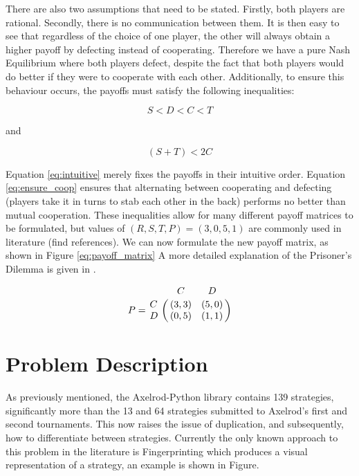 There are also two assumptions that need to be stated.
Firstly, both players are rational.
Secondly, there is no communication between them.
It is then easy to see that regardless of the choice of one player, the other will always obtain a higher payoff by defecting instead of cooperating.
Therefore we have a pure Nash Equilibrium where both players defect, despite the fact that both players would do better if they were to cooperate with each other.
Additionally, to ensure this behaviour occurs, the payoffs must satisfy the following inequalities:

\begin{equation}\label{eq:intuitive}
S < D < C < T
\end{equation}

and

\begin{equation}\label{eq:ensure_coop}
(S + T) < 2 C
\end{equation}

Equation \ref{eq:intuitive} merely fixes the payoffs in their intuitive order.
Equation \ref{eq:ensure_coop} ensures that alternating between cooperating and defecting (players take it in turns to stab each other in the back) performs no better than mutual cooperation.
These inequalities allow for many different payoff matrices to be formulated, but values of $(R, S, T, P) = (3, 0, 5, 1)$ are commonly used in literature (find references). %
We can now formulate the new payoff matrix, as shown in Figure \ref{eq:payoff_matrix}
A more detailed explanation of the Prisoner's Dilemma is given in \cite{Gotts2003}.

\begin{equation}\label{eq:payoff_matrix}
%
P = \bordermatrix{~ & C & D \cr
                  C & (3, 3) & (5, 0) \cr
                  D & (0, 5) & (1, 1) \cr}
%
\end{equation}

\section{Problem Description}

As previously mentioned, the Axelrod-Python library contains 139 strategies,
significantly more than the 13 and 64 strategies submitted to Axelrod's first
and second tournaments.  %
This now raises the issue of duplication, and subsequently, how to differentiate between strategies.
Currently the only known approach to this problem in the literature is Fingerprinting which produces a visual representation of a strategy, an example is shown in Figure. %

